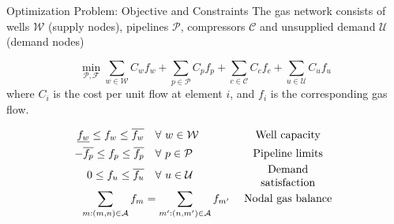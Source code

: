 \documentclass[hyperref={colorlinks,citecolor=blue,linkcolor=blue,urlcolor=blue}]{beamer}
\begin{document}
\begin{frame}{Optimization Problem: Objective and Constraints}
\footnotesize
The gas network consists of wells $\mathcal{W}$ (supply nodes), pipelines $\mathcal{P}$, compressors $\mathcal{C}$ and unsupplied demand $\mathcal{U}$ (demand nodes) 

\[
\min_{\mathcal{P}, \mathcal{F}} 
\sum_{w \in \mathcal{W}} C_{w} f_{w} +
\sum_{p \in \mathcal{P}} C_{p} f_{p} +
\sum_{c \in \mathcal{C}} C_{c} f_{c} +
\sum_{u \in \mathcal{U}} C_{u} f_{u}
\]
where $C_i$ is the cost per unit flow at element $i$, and $f_i$ is the corresponding gas flow.

\begin{align}
    \underline{f_{w}} \leq f_{w} \leq \overline{f_{w}} 
    &\quad \forall \ w \in \mathcal{W} 
    &&\parbox{3cm}{\centering Well capacity} \label{eq:well_limits} \\
    -\overline{f_{p}} \leq f_{p} \leq \overline{f_{p}} 
    &\quad \forall \ p \in \mathcal{P} 
    &&\parbox{3cm}{\centering Pipeline limits} \label{eq:pipe_limits} \\
    0 \leq f_{u} \leq \overline{f_{u}} 
    &\quad \forall \ u \in \mathcal{U} 
    &&\parbox{3cm}{\centering Demand satisfaction} \label{eq:dem_limit_gas} \\
    \sum_{m:(m,n)\in\mathcal{A}} f_{m} 
    &= \sum_{m':(n,m')\in\mathcal{A}} f_{m'} 
    &&\parbox{3cm}{\centering Nodal gas balance} \label{eq:gas_balance}
\end{align}
\end{frame}
\end{document}
